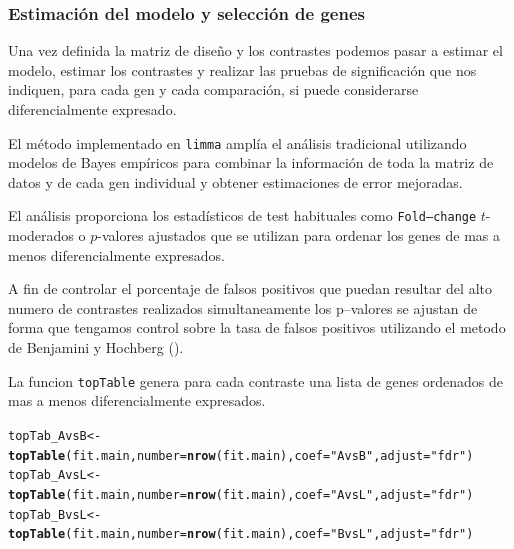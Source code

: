 \documentclass[a4paper]{article}\usepackage[]{graphicx}\usepackage[]{color}
\makeatletter
\newcommand{\hlstr}[1]{\textcolor[rgb]{0.192,0.494,0.8}{#1}}%
\newcommand{\hlstd}[1]{\textcolor[rgb]{0.345,0.345,0.345}{#1}}%
\newcommand{\hlkwb}[1]{\textcolor[rgb]{0.69,0.353,0.396}{#1}}%
\newcommand{\hlkwc}[1]{\textcolor[rgb]{0.333,0.667,0.333}{#1}}%
\newcommand{\hlkwd}[1]{\textcolor[rgb]{0.737,0.353,0.396}{\textbf{#1}}}%
\newenvironment{kframe}{%
 \def\at@end@of@kframe{}%
 \ifinner\ifhmode%
  \def\at@end@of@kframe{\end{minipage}}%
  \begin{minipage}{\columnwidth}%
 \fi\fi%
 \def\FrameCommand##1{\hskip\@totalleftmargin \hskip-\fboxsep
 \colorbox{shadecolor}{##1}\hskip-\fboxsep
     \hskip-\linewidth \hskip-\@totalleftmargin \hskip\columnwidth}%
 \MakeFramed {\advance\hsize-\width
   \@totalleftmargin\z@ \linewidth\hsize
   \@setminipage}}%
 {\par\unskip\endMakeFramed%
 \at@end@of@kframe}
\newenvironment{knitrout}{}{} %
\newcommand{\Rpackage}[1]{{\texttt{#1}}}
\makeatother
\begin{document}
\subsubsection{Estimación del modelo y selección de genes}

Una vez definida la matriz de diseño y los contrastes podemos pasar a estimar 
el modelo, estimar los contrastes y realizar las pruebas de significación 
que nos indiquen, para cada gen y cada comparaci\'on, 
si puede considerarse diferencialmente expresado.



El método implementado en \Rpackage {limma} amplía el análisis tradicional 
utilizando modelos de Bayes empíricos para combinar la información de toda la matriz de datos y de cada gen individual y  obtener estimaciones de error mejoradas.

El análisis proporciona los estadísticos de test habituales como \texttt{Fold--change}
$t$-moderados o $p$-valores ajustados que se utilizan para ordenar los genes de mas a menos diferencialmente expresados.

A fin de controlar el porcentaje de falsos positivos que puedan resultar del alto numero de contrastes realizados simultaneamente
los p--valores se ajustan de forma que tengamos control sobre la tasa de falsos positivos utilizando el metodo 
de Benjamini y Hochberg (\cite{BenjaminiHochberg:1995}). 

La funcion \texttt{topTable} genera para cada contraste una lista de genes 
ordenados de mas a menos diferencialmente expresados.

\begin{knitrout}
\color{fgcolor}\begin{kframe}
\begin{alltt}
\hlstd{topTab_AvsB} \hlkwb{<-} \hlkwd{topTable} \hlstd{(fit.main,} \hlkwc{number}\hlstd{=}\hlkwd{nrow}\hlstd{(fit.main),} \hlkwc{coef}\hlstd{=}\hlstr{"AvsB"}\hlstd{,} \hlkwc{adjust}\hlstd{=}\hlstr{"fdr"}\hlstd{)}
\hlstd{topTab_AvsL} \hlkwb{<-} \hlkwd{topTable} \hlstd{(fit.main,} \hlkwc{number}\hlstd{=}\hlkwd{nrow}\hlstd{(fit.main),} \hlkwc{coef}\hlstd{=}\hlstr{"AvsL"}\hlstd{,} \hlkwc{adjust}\hlstd{=}\hlstr{"fdr"}\hlstd{)}
\hlstd{topTab_BvsL}  \hlkwb{<-} \hlkwd{topTable} \hlstd{(fit.main,} \hlkwc{number}\hlstd{=}\hlkwd{nrow}\hlstd{(fit.main) ,} \hlkwc{coef}\hlstd{=}\hlstr{"BvsL"}\hlstd{,} \hlkwc{adjust}\hlstd{=}\hlstr{"fdr"}\hlstd{)}
\end{alltt}
\end{kframe}
\end{knitrout}
\end{document}

